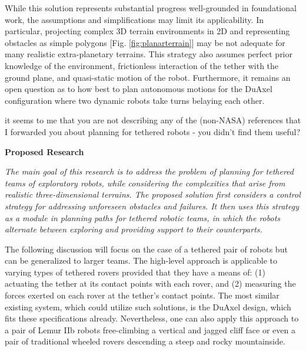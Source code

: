 \documentclass[12pt]{article}
\newcommand{\kostas}[1]{{\color{blue} #1}}
\begin{document}
While this solution represents substantial progress well-grounded in
foundational work, the assumptions and simplifications may limit its
applicability. In particular, projecting complex 3D terrain
environments in 2D and representing obstacles as simple polygons
[Fig. \ref{fig:planarterrain}] may be not adequate for many realistic
extra-planetary terrains.  This strategy also assumes perfect prior
knowledge of the environment, frictionless interaction of the tether
with the ground plane, and quasi-static motion of the robot.
Furthermore, it remains an open question as to how best to plan
autonomous motions for the DuAxel configuration where two dynamic
robots take turns belaying each other.

\kostas{it seems to me that you are not describing any of the (non-NASA)
  references that I forwarded you about planning for tethered robots -
you didn't find them useful?}



{\bf\noindent Proposed Research}

{\sl The main goal of this research is to address the problem of
  planning for tethered teams of exploratory robots, while considering
  the complexities that arise from realistic three-dimensional
  terrains.  The proposed solution first considers a control strategy
  for addressing unforeseen obstacles and failures. It then uses this
  strategy as a module in planning paths for tethered robotic teams,
  in which the robots alternate between exploring and providing
  support to their counterparts.}

The following discussion will focus on the case of a tethered pair of
robots but can be generalized to larger teams. The high-level approach
is applicable to varying types of tethered rovers provided that they
have a means of: (1) actuating the tether at its contact points with
each rover, and (2) measuring the forces exerted on each rover at the
tether's contact points. The most similar existing system, which could
utilize such solutions, is the DuAxel design, which fits these
specifications already. Nevertheless, one can also apply this approach
to a pair of Lemur IIb robots free-climbing a vertical and jagged
cliff face or even a pair of traditional wheeled rovers descending a
steep and rocky mountainside.
\end{document}
